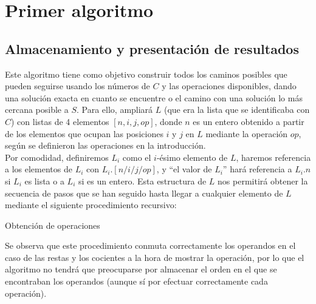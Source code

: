 \section{Primer algoritmo}

\subsection{Almacenamiento y presentación de resultados}
Este algoritmo tiene como objetivo construir todos los caminos posibles
que pueden seguirse usando los números de $C$ y las operaciones disponibles,
dando una solución exacta en cuanto se encuentre o el camino con una solución lo
más cercana posible a $S$. Para ello, ampliará $L$ (que era la lista que se
identificaba con $C$) con listas de 4 elementos $[n, i, j, op]$, donde $n$ es un
entero obtenido a partir de los elementos que ocupan las posiciones $i$ y $j$ en
$L$ mediante la operación $op$, según se definieron las operaciones en la
introducción.\\

Por comodidad,
definiremos $L_i$ como el $i$-ésimo elemento de $L$, haremos referencia a los
elementos de $L_i$ con $L_i.[n/i/j/op]$, y ``el valor de $L_i$'' hará referencia
a $L_i.n$ si $L_i$ es lista o a $L_i$ si es un entero.
Esta estructura de $L$ nos permitirá obtener la secuencia de pasos que
se han seguido hasta llegar a cualquier elemento de $L$
mediante el siguiente procedimiento recursivo:\\

\begin{algorithm}[H]
\caption{Obtención de operaciones}
\end{algorithm}

\vspace{0.4cm}

Se observa que este procedimiento conmuta correctamente los operandos en el caso
de las restas y los cocientes a la hora de mostrar la operación, por lo que el
algoritmo no tendrá que preocuparse por almacenar el orden en el que se encontraban
los operandos (aunque sí por efectuar correctamente cada operación).

